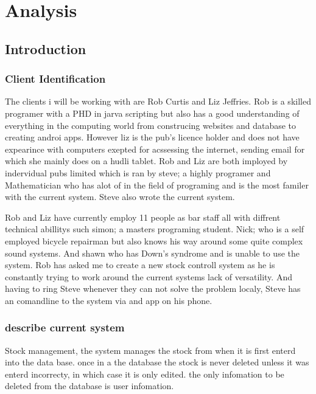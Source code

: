 \chapter{Analysis}

\section{Introduction}

\subsection{Client Identification}

The clients i will be working with are Rob Curtis and Liz Jeffries. Rob is a skilled programer with a PHD in jarva scripting but also has a good understanding of everything in the computing world from construcing websites and database to creating androi apps. However liz is the pub's licence holder and does not have expearince with computers exepted for acssessing the internet, sending email for which she mainly does on a hudli tablet. Rob and Liz are both imployed by indervidual pubs limited which is ran by steve; a highly programer and Mathematician who has alot of in the field of programing and is the most familer with the current system. Steve also wrote the current system.

Rob and Liz have currently employ 11 people as bar staff all with diffrent technical abillitys such simon; a masters programing student. Nick; who is a self employed bicycle repairman but also knows his way around some quite complex sound systems. And shawn who has Down's syndrome and is unable to use the system. Rob has asked me to create a new stock controll system as he is constantly trying to work around the current systems lack of versatility. And having to ring Steve whenever they can not solve the problem localy, Steve has an comandline to the system via and app on his phone.

\subsection{describe current system}

Stock management, the system manages the stock from when it is first enterd into the data base. once in a the database the stock is never deleted unless it was enterd incorrecty, in which case it is only edited. the only infomation to be deleted from the database is user infomation.


